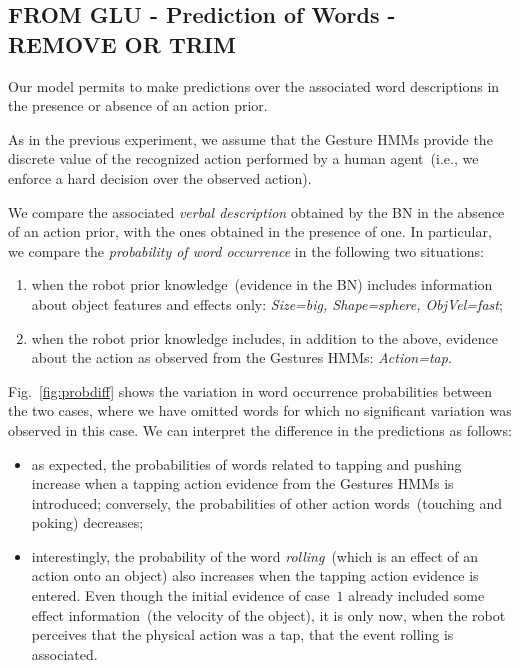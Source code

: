 \subsection{FROM GLU - Prediction of Words - REMOVE OR TRIM}

Our model permits to make predictions over the associated word descriptions in the presence or absence of an action prior.

As in the previous experiment, we assume that the Gesture \acp{HMM} provide the discrete value of the recognized action performed by a human agent~(i.e., we enforce a hard decision over the observed action).

We compare the associated \emph{verbal description} obtained by the \acl{BN} in the absence of an action prior, with the ones obtained in the presence of one. In particular, we compare the \emph{probability of word occurrence} in the following two situations:
\begin{enumerate}
\item when the robot prior knowledge~(evidence in the \ac{BN}) includes information about object features and effects only: \emph{Size=big, Shape=sphere, ObjVel=fast};

\item when the robot prior knowledge includes, in addition to the above, evidence about the action as observed from the Gestures \acp{HMM}: \emph{Action=tap}.
\end{enumerate}

Fig.~\ref{fig:probdiff} shows the variation in word occurrence probabilities between the two cases, where we have omitted words for which no significant variation was observed in this case. We can interpret the difference in the predictions as follows:
\begin{itemize}
\item as expected, the probabilities of words related to tapping and pushing increase when a tapping action evidence from the Gestures \acp{HMM} is introduced; conversely, the probabilities of other action words~(touching and poking) decreases;

\item interestingly, the probability of the word \emph{rolling}~(which is an effect of an action onto an object) also increases when the tapping action evidence is entered. Even though the initial evidence of case~$1$ already included some effect information~(the velocity of the object), it is only now, when the robot perceives that the physical action was a tap, that the event rolling is associated.
\end{itemize}

